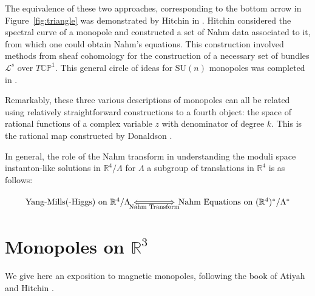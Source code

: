 	The equivalence of these two approaches, corresponding to the bottom arrow in Figure~\ref{fig:triangle} was demonstrated by Hitchin in \cite{hitchin1983}. Hitchin considered the spectral curve of a monopole and constructed a set of Nahm data associated to it, from which one could obtain Nahm's equations. This construction involved methods from sheaf cohomology for the construction of a necessary set of bundles $\mathcal L^s$ over $T \mathbb{CP}^1$.
	This general circle of ideas for $\mathrm{SU}(n)$ monopoles was completed in \cite{hurtubise1989}.
	
	Remarkably, these three various descriptions of monopoles can all be related using relatively straightforward constructions to a fourth object: the space of rational functions of a complex variable $z$ with denominator of degree $k$. This is the rational map constructed by Donaldson \cite{donaldson1984nahm}.
	
	In general, the role of the Nahm transform in understanding the moduli space instanton-like solutions in $\mathbb R^4 / \Lambda$ for $\Lambda$ a subgroup of translations in $\mathbb R^4$ is as follows:
	
	\[
	\begin{tikzcd}
	\text{Yang-Mills(-Higgs) on }\mathbb R^4/\Lambda
	 \arrow[rr, Leftrightarrow,"\text{Nahm Transform}",swap]&&
	\text{Nahm Equations on } (\mathbb R^4)^*/\Lambda^*
	\end{tikzcd}
	\]
	
	
	\section{Monopoles on $\mathbb R^3$}
	We give here an exposition to magnetic monopoles, following the book of Atiyah and Hitchin \cite{atiyahhitchin1988}.
	
